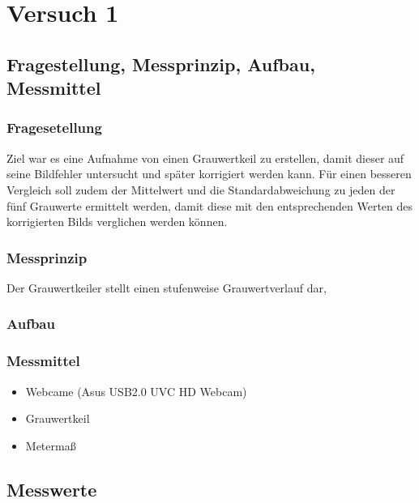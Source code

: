 \chapter{Versuch 1}
\label{chap:VERSUCH_1}


\section{Fragestellung, Messprinzip, Aufbau, Messmittel}
\label{chap:VERSUCH_1_FRAGESTELLUNG}

\subsection*{Fragesetellung}

Ziel war es eine Aufnahme von einen Grauwertkeil zu erstellen, damit dieser auf seine Bildfehler untersucht und später korrigiert werden kann.
Für einen besseren Vergleich soll zudem der Mittelwert und die Standardabweichung zu jeden der fünf Grauwerte ermittelt werden, damit diese mit den entsprechenden Werten des korrigierten Bilds verglichen werden können.

\subsection*{Messprinzip}
Der Grauwertkeiler stellt einen stufenweise Grauwertverlauf dar, 

\subsection*{Aufbau}

\subsection{Messmittel}
\begin{itemize}
\item Webcame (Asus USB2.0 UVC HD Webcam)
\item Grauwertkeil
\item Metermaß
\end{itemize}

\section{Messwerte}
\label{chap:VERSUCH_1_MESSWERTE}

